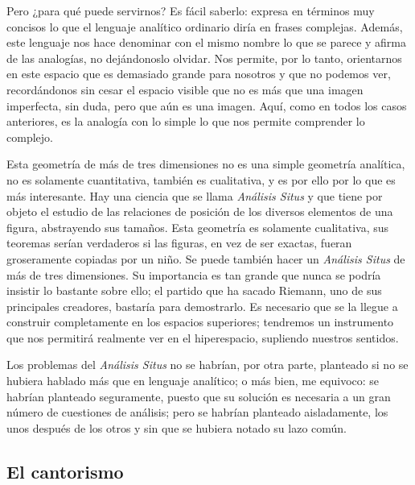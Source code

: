 \documentclass[a4paper, 12pt]{article}
\begin{document}
Pero ¿para qué puede servirnos? Es fácil saberlo: expresa en términos muy concisos lo que el lenguaje analítico ordinario diría
en frases complejas. Además, este lenguaje nos hace denominar con el
mismo nombre lo que se parece y afirma de las analogías, no dejándonoslo olvidar. Nos permite, por lo tanto, orientarnos en este espacio que
es demasiado grande para nosotros y que no podemos ver, recordándonos
sin cesar el espacio visible que no es más que una imagen imperfecta,
sin duda, pero que aún es una imagen. Aquí, como en todos los casos
anteriores, es la analogía con lo simple lo que nos permite comprender
lo complejo.

Esta geometría de más de tres dimensiones no es una simple geometría analítica, no es solamente cuantitativa, también es
cualitativa, y es por ello por lo que es más interesante. Hay una
ciencia que se llama \textit{Análisis Situs} y que tiene por objeto el estudio de
las relaciones de posición de los diversos elementos de una figura,
abstrayendo sus tamaños. Esta geometría es solamente cualitativa,
sus teoremas serían verdaderos si las figuras, en vez de ser exactas,
fueran groseramente copiadas por un niño. Se puede también hacer un \textit{Análisis Situs} de más de tres dimensiones. Su importancia es tan grande que nunca se podría insistir lo bastante sobre ello; el partido que ha sacado Riemann,
uno de sus principales creadores, bastaría para demostrarlo. Es
necesario que se la llegue a construir completamente en los espacios
superiores; tendremos un instrumento que nos permitirá realmente ver
en el hiperespacio, supliendo nuestros sentidos.

Los problemas del \textit{Análisis Situs} no se habrían, por otra parte,
planteado si no se hubiera hablado más que en lenguaje analítico; o más bien, me equivoco: se habrían planteado seguramente, puesto que
su solución es necesaria a un gran número de cuestiones de análisis; pero se habrían planteado aisladamente, los unos después de
los otros y sin que se hubiera notado su lazo común.




\subsection*{El cantorismo}
\end{document}
